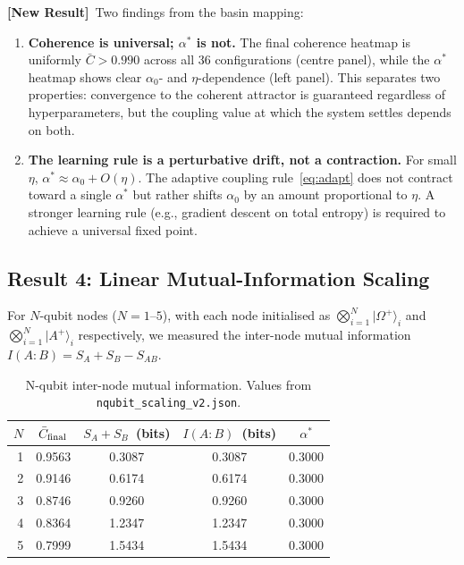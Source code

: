 \documentclass[12pt]{article}
\newcommand{\newresult}{\textbf{[New Result]}}
\newcommand{\ket}[1]{|#1\rangle}
\begin{document}
\newresult\ Two findings from the basin mapping:

\begin{enumerate}
\item \textbf{Coherence is universal; $\alpha^*$ is not.}
  The final coherence heatmap is uniformly $\bar{C} > 0.990$ across all
  36 configurations (centre panel), while the $\alpha^*$ heatmap shows
  clear $\alpha_0$- and $\eta$-dependence (left panel).  This separates
  two properties: convergence to the coherent attractor is guaranteed
  regardless of hyperparameters, but the coupling value at which the system
  settles depends on both.

\item \textbf{The learning rule is a perturbative drift, not a contraction.}
  For small $\eta$, $\alpha^* \approx \alpha_0 + O(\eta)$.  The adaptive
  coupling rule~\eqref{eq:adapt} does not contract toward a single $\alpha^*$
  but rather shifts $\alpha_0$ by an amount proportional to $\eta$.
  A stronger learning rule (e.g., gradient descent on total entropy) is
  required to achieve a universal fixed point.
\end{enumerate}

\subsection{Result 4: Linear Mutual-Information Scaling}
\label{sec:r4}

For $N$-qubit nodes ($N=1$--$5$), with each node initialised as
$\bigotimes_{i=1}^N \ket{\Omega^+}_i$ and
$\bigotimes_{i=1}^N \ket{A^+}_i$ respectively, we measured
the inter-node mutual information $I(A:B) = S_A + S_B - S_{AB}$.

\begin{table}[H]
\centering
\caption{N-qubit inter-node mutual information.  Values from
  \texttt{nqubit\_scaling\_v2.json}.}
\label{tab:scaling}
\begin{tabular}{rcccc}
\toprule
$N$ & $\bar{C}_{\rm final}$ & $S_A + S_B$~(bits) & $I(A:B)$~(bits) & $\alpha^*$\\
\midrule
1 & 0.9563 & 0.3087 & 0.3087 & 0.3000\\
2 & 0.9146 & 0.6174 & 0.6174 & 0.3000\\
3 & 0.8746 & 0.9260 & 0.9260 & 0.3000\\
4 & 0.8364 & 1.2347 & 1.2347 & 0.3000\\
5 & 0.7999 & 1.5434 & 1.5434 & 0.3000\\
\bottomrule
\end{tabular}
\end{table}
\end{document}
